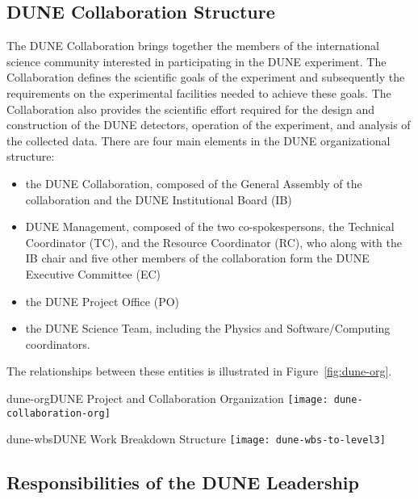 \subsection{DUNE Collaboration Structure}

The DUNE Collaboration brings together the members of the international science community 
interested in participating in the DUNE experiment.  The Collaboration defines the scientific goals of the experiment and subsequently 
the requirements on the experimental facilities needed to achieve these goals.  The Collaboration also provides the scientific effort required for the design and construction of the DUNE detectors, operation of the experiment, and analysis of the 
collected data. There are four main elements in the DUNE organizational structure:  
\begin{itemize}
\item the DUNE Collaboration, composed of the General Assembly of the collaboration and the DUNE Institutional Board (IB)     
\item DUNE Management, composed of the two co-spokespersons, the Technical Coordinator (TC), and the Resource Coordinator (RC), who along
  with the IB chair and five other members of the collaboration form the DUNE Executive Committee (EC)
\item the DUNE Project Office (PO)
\item the DUNE Science Team, including the Physics and Software/Computing coordinators. 
\end{itemize}
The relationships between these entities is illustrated in Figure~\ref{fig:dune-org}.

\begin{cdrfigure}{dune-org}{DUNE Project and Collaboration Organization}
  \texttt{[image: dune-collaboration-org]}
\end{cdrfigure}

\begin{cdrfigure}{dune-wbs}{DUNE Work Breakdown Structure}
  \texttt{[image: dune-wbs-to-level3]}
\end{cdrfigure}

\subsection{Responsibilities of the DUNE Leadership}

